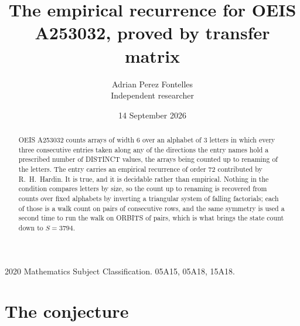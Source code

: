 \documentclass[11pt,a4paper]{article}
\title{The empirical recurrence for OEIS A253032, proved by transfer matrix}
\author{Adrian Perez Fontelles\\ \small Independent researcher}
\date{14 September 2026}
\theoremstyle{plain}
\theoremstyle{definition}
\begin{document}
\maketitle

\begin{abstract}
OEIS A253032 counts arrays of width $6$ over an alphabet of $3$ letters in which every three
consecutive entries taken along any of the directions the entry names hold a prescribed number of
DISTINCT values, the arrays being counted up to renaming of the letters. The entry carries an
empirical recurrence of order $72$ contributed by R.~H.~Hardin. It is true, and it is
decidable rather than empirical. Nothing in the condition compares letters by size, so the
count up to renaming is recovered from counts over fixed alphabets by inverting a triangular
system of falling factorials; each of those is a walk count on pairs of consecutive rows, and
the same symmetry is used a second time to run the walk on ORBITS of pairs, which is what
brings the state count down to $S=3794$.
\end{abstract}

\noindent\small 2020 Mathematics Subject Classification. 05A15, 05A18, 15A18.\normalsize

\section{The conjecture}
\end{document}
